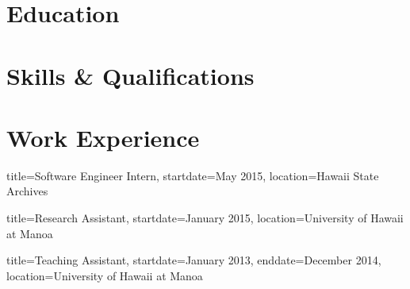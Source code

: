 \documentclass{resume}
\begin{document}

\makeheader

\section{Education}
\section{Skills \& Qualifications}
\section{Work Experience}

%
\begin{job}{title=Software Engineer Intern,
            startdate=May 2015,
            location=Hawaii State Archives}
\end{job}

\begin{job}{title=Research Assistant,
            startdate=January 2015,
            location=University of Hawaii at Manoa}
\end{job}

\begin{job}{title=Teaching Assistant,
            startdate=January 2013,
            enddate=December 2014,
            location=University of Hawaii at Manoa}
\end{job}
\end{document}
